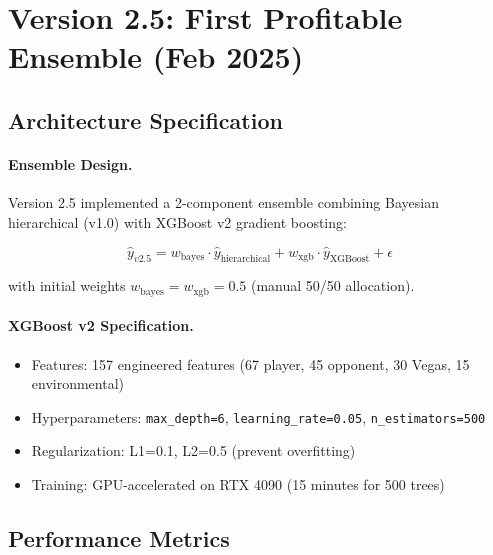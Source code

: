 \section{Version 2.5: First Profitable Ensemble (Feb 2025)}
\label{sec:arch-v2p5}

\subsection{Architecture Specification}

\paragraph{Ensemble Design.}
Version 2.5 implemented a 2-component ensemble combining Bayesian hierarchical (v1.0) with XGBoost v2 gradient boosting:

\begin{equation}
\label{eq:v2p5-ensemble}
\hat{y}_{v2.5} = w_{\text{bayes}} \cdot \hat{y}_{\text{hierarchical}} + w_{\text{xgb}} \cdot \hat{y}_{\text{XGBoost}} + \epsilon
\end{equation}

\noindent with initial weights $w_{\text{bayes}} = w_{\text{xgb}} = 0.5$ (manual 50/50 allocation).

\paragraph{XGBoost v2 Specification.}
\begin{itemize}[itemsep=2pt,parsep=0pt]
    \item Features: 157 engineered features (67 player, 45 opponent, 30 Vegas, 15 environmental)
    \item Hyperparameters: \texttt{max\_depth=6}, \texttt{learning\_rate=0.05}, \texttt{n\_estimators=500}
    \item Regularization: L1=0.1, L2=0.5 (prevent overfitting)
    \item Training: GPU-accelerated on RTX 4090 (15 minutes for 500 trees)
\end{itemize}

\subsection{Performance Metrics}

